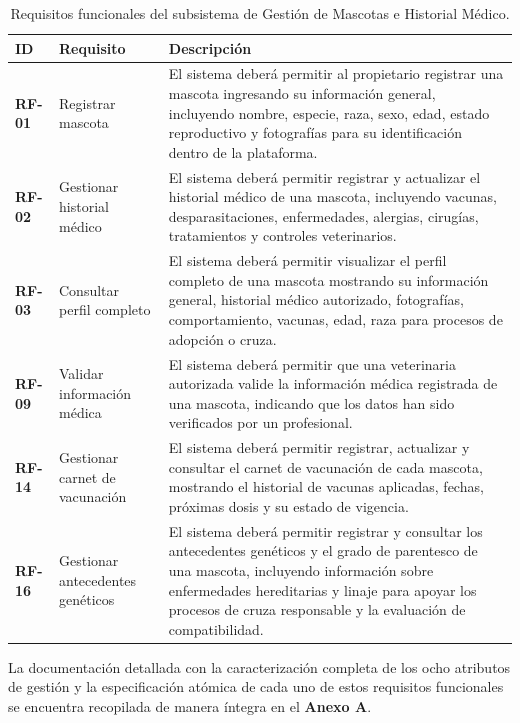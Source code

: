 \documentclass[journal,onecolumn]{IEEEtran}
\begin{document}
	\begin{table}[H]
		\caption{Requisitos funcionales del subsistema de Gestión de Mascotas e Historial Médico.}
		\label{tab:rf_modulo}
		\centering
		\renewcommand{\arraystretch}{1.2}
		\begin{tabularx}{\linewidth}{|l|l|X|}
			\hline
			\textbf{ID} & \textbf{Requisito} & \textbf{Descripción} \\
			\hline
			\textbf{RF-01} & Registrar mascota & El sistema deberá permitir al propietario registrar una mascota ingresando su información general, incluyendo nombre, especie, raza, sexo, edad, estado reproductivo y fotografías para su identificación dentro de la plataforma. \\ \hline
			\textbf{RF-02} & Gestionar historial médico & El sistema deberá permitir registrar y actualizar el historial médico de una mascota, incluyendo vacunas, desparasitaciones, enfermedades, alergias, cirugías, tratamientos y controles veterinarios. \\ \hline
			\textbf{RF-03} & Consultar perfil completo & El sistema deberá permitir visualizar el perfil completo de una mascota mostrando su información general, historial médico autorizado, fotografías, comportamiento, vacunas, edad, raza para procesos de adopción o cruza. \\ \hline
			\textbf{RF-09} & Validar información médica & El sistema deberá permitir que una veterinaria autorizada valide la información médica registrada de una mascota, indicando que los datos han sido verificados por un profesional. \\ \hline
			\textbf{RF-14} & Gestionar carnet de vacunación & El sistema deberá permitir registrar, actualizar y consultar el carnet de vacunación de cada mascota, mostrando el historial de vacunas aplicadas, fechas, próximas dosis y su estado de vigencia. \\ \hline
			\textbf{RF-16} & Gestionar antecedentes genéticos & El sistema deberá permitir registrar y consultar los antecedentes genéticos y el grado de parentesco de una mascota, incluyendo información sobre enfermedades hereditarias y linaje para apoyar los procesos de cruza responsable y la evaluación de compatibilidad. \\
			\hline
		\end{tabularx}
	\end{table}
	La documentación detallada con la caracterización completa de los ocho atributos de gestión y la especificación atómica de cada uno de estos requisitos funcionales se encuentra recopilada de manera íntegra en el \textbf{Anexo A}.
	
\end{document}
